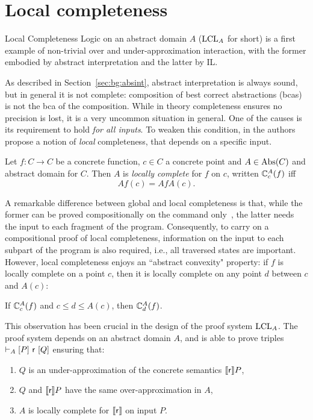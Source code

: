\section{Local completeness}\label{sec:sota:lcl}
Local Completeness Logic on an abstract domain $A$ ($\text{LCL}_A$ for short) \cite{BGGR21} is a first example of non-trivial over and under-approximation interaction, with the former embodied by abstract interpretation and the latter by IL.

As described in Section~\ref{sec:bg:absint}, abstract interpretation is always sound, but in general it is not complete: composition of best correct abstractions (bcas) is not the bca of the composition. While in theory completeness ensures no precision is lost, it is a very uncommon situation in general. One of the causes is its requirement to hold \emph{for all inputs}. To weaken this condition, in \cite{BGGR21} the authors propose a notion of \emph{local} completeness, that depends on a specific input.
\begin{definition}
	Let $f: C \rightarrow C$ be a concrete function, $c \in C$ a concrete point and $A \in \text{\normalfont Abs}(C)$ and abstract domain for $C$. Then $A$ is \emph{locally complete} for $f$ on $c$, written $\mathbb{C}^{A}_{c}(f)$ iff
	\[
	Af(c) = AfA(c) .
	\]
\end{definition}

A remarkable difference between global and local completeness is that, while the former can be proved compositionally on the command only~\cite{GLR15}, the latter needs the input to each fragment of the program. Consequently, to carry on a compositional proof of local completeness, information on the input to each subpart of the program is also required, i.e., all traversed states are important. However, local completeness enjoys an ``abstract convexity" property: if $f$ is locally complete on a point $c$, then it is locally complete on any point $d$ between $c$ and $A(c)$:

\begin{lemma}\label{lmm:sota:abstract-convexity}
	If $\mathbb{C}^{A}_{c}(f)$ and $c \le d \le A(c)$, then $\mathbb{C}^{A}_{d}(f)$.
\end{lemma}

This observation has been crucial in the design of the proof system $\text{LCL}_A$. The proof system depends on an abstract domain $A$, and is able to prove triples $\vdash_{A}\nobreak[P]~\mathsf{r}~[Q]$  ensuring that:

\begin{enumerate}
	\item $Q$ is an under-approximation of the concrete semantics $\llbracket\mathsf{r}\rrbracket P$,
	\item $Q$ and $\llbracket\mathsf{r}\rrbracket P$ have the same over-approximation in $A$,
	\item $A$ is locally complete for $\llbracket\mathsf{r}\rrbracket$ on input $P$.
\end{enumerate}

